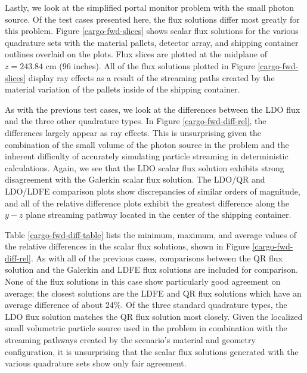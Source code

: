 \documentclass{article} %
\begin{document}
Lastly, we look at the simplified portal monitor problem with the small photon
source. Of the test cases presented here, the flux solutions differ most
greatly for this problem. Figure \ref{cargo-fwd-slices} shows scalar flux
solutions for the various quadrature sets with the material pallets,
detector array, and shipping container outlines overlaid on the plots. Flux
slices are plotted at the midplane of $z = 243.84$ cm (96 inches). All of the
flux solutions plotted in Figure \ref{cargo-fwd-slices} display ray effects
as a result of the streaming paths created by the material variation of the
pallets inside of the shipping container.

As with the previous test cases, we look at the differences between the 
LDO flux and the three other quadrature types. In Figure
\ref{cargo-fwd-diff-rel}, the differences largely appear as ray effects. This
is unsurprising given the combination of the small volume of the photon 
source in the problem and the inherent difficulty of accurately simulating
particle streaming in deterministic calculations. Again, we see that the LDO
scalar flux solution exhibits strong disagreement with the Galerkin scalar
flux solution. The LDO/QR and LDO/LDFE comparison plots show discrepancies of
similar orders of magnitude, and all of the relative difference plots exhibit
the greatest difference along the $y-z$ plane streaming pathway located in the
center of the shipping container.

Table \ref{cargo-fwd-diff-table} lists the minimum, maximum, and average
values of the relative differences in the scalar flux solutions, shown in
Figure \ref{cargo-fwd-diff-rel}. As with all of the previous cases,
comparisons between the QR flux solution and the Galerkin and LDFE flux
solutions are included for comparison. None of the flux solutions in this case
show particularly good agreement on average; the closest solutions are the
LDFE and QR flux solutions which have an average difference of about 24\%. Of
the three standard quadrature types, the LDO flux solution matches the QR flux
solution most closely. Given the localized small volumetric particle source
used in the problem in  combination with the streaming pathways created by the
scenario's material and geometry configuration, it is unsurprising that the
scalar flux solutions generated with the various quadrature sets show only
fair agreement.
\end{document}
